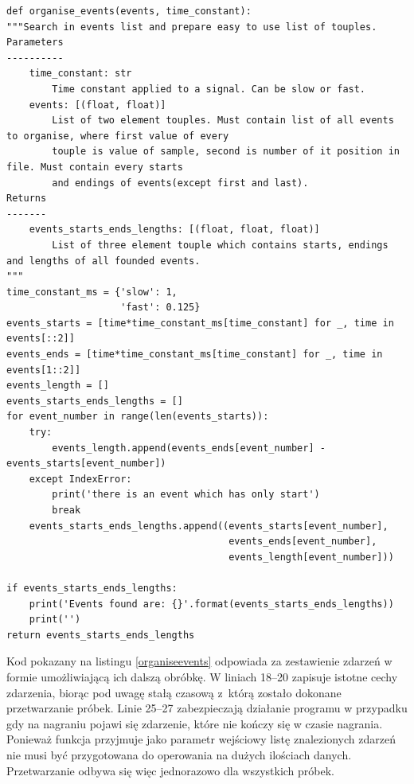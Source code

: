 \documentclass[eng,printmode]{mgr}
\begin{document}
\begin{minipage}{\linewidth}
\begin{lstlisting}[caption={fragment kodu źródłowego pliku Detectors.py, klasa EventsOrganiser, metoda organise\_events},captionpos=b,label={organiseevents}]  
    def organise_events(events, time_constant):
"""Search in events list and prepare easy to use list of touples.
Parameters
----------
    time_constant: str
        Time constant applied to a signal. Can be slow or fast.
    events: [(float, float)]
        List of two element touples. Must contain list of all events to organise, where first value of every
        touple is value of sample, second is number of it position in file. Must contain every starts
        and endings of events(except first and last).
Returns
-------
    events_starts_ends_lengths: [(float, float, float)]
        List of three element touple which contains starts, endings and lengths of all founded events.
"""
time_constant_ms = {'slow': 1,
                    'fast': 0.125}
events_starts = [time*time_constant_ms[time_constant] for _, time in events[::2]]
events_ends = [time*time_constant_ms[time_constant] for _, time in events[1::2]]
events_length = []
events_starts_ends_lengths = []
for event_number in range(len(events_starts)):
    try:
        events_length.append(events_ends[event_number] - events_starts[event_number])
    except IndexError:
        print('there is an event which has only start')
        break
    events_starts_ends_lengths.append((events_starts[event_number],
                                       events_ends[event_number],
                                       events_length[event_number]))

if events_starts_ends_lengths:
    print('Events found are: {}'.format(events_starts_ends_lengths))
    print('')
return events_starts_ends_lengths
\end{lstlisting}
\end{minipage}

Kod pokazany na listingu \ref{organiseevents} odpowiada za zestawienie zdarzeń w formie umożliwiającą ich dalszą obróbkę. W liniach 18--20 zapisuje istotne cechy zdarzenia, biorąc pod uwagę stałą czasową  z~którą zostało dokonane przetwarzanie próbek. Linie 25--27 zabezpieczają działanie programu w przypadku gdy na nagraniu pojawi się zdarzenie, które nie kończy się w czasie nagrania. Ponieważ funkcja przyjmuje jako parametr wejściowy listę znalezionych zdarzeń nie musi być przygotowana do operowania na dużych ilościach danych. Przetwarzanie odbywa się więc jednorazowo dla wszystkich próbek. 
\end{document}
